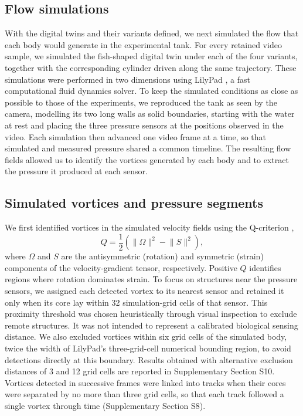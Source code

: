 \documentclass[openacc]{rsproca_new}
\begin{document}
\subsection{Flow simulations}

With the digital twins and their variants defined, we next simulated the flow that each body would generate in the experimental tank. For every retained video sample, we simulated the fish-shaped digital twin under each of the four variants, together with the corresponding cylinder driven along the same trajectory. These simulations were performed in two dimensions using LilyPad \cite{maertens2015}, a fast computational fluid dynamics solver. To keep the simulated conditions as close as possible to those of the experiments, we reproduced the tank as seen by the camera, modelling its two long walls as solid boundaries, starting with the water at rest and placing the three pressure sensors at the positions observed in the video. Each simulation then advanced one video frame at a time, so that simulated and measured pressure shared a common timeline. The resulting flow fields allowed us to identify the vortices generated by each body and to extract the pressure it produced at each sensor.

\subsection{Simulated vortices and pressure segments}
\label{sec:vortices}

We first identified vortices in the simulated velocity fields using the Q-criterion \cite{hunt1988,kolar2007},
\begin{equation}
Q=\frac{1}{2}\left(\lVert \Omega \rVert^2-\lVert S \rVert^2\right),
\end{equation}
where $\Omega$ and $S$ are the antisymmetric (rotation) and symmetric (strain) components of the velocity-gradient tensor, respectively. Positive $Q$ identifies regions where rotation dominates strain. To focus on structures near the pressure sensors, we assigned each detected vortex to its nearest sensor and retained it only when its core lay within 32 simulation-grid cells of that sensor. This proximity threshold was chosen heuristically through visual inspection to exclude remote structures. It was not intended to represent a calibrated biological sensing distance. We also excluded vortices within six grid cells of the simulated body, twice the width of LilyPad's three-grid-cell numerical bounding region, to avoid detections directly at this boundary. Results obtained with alternative exclusion distances of 3 and 12 grid cells are reported in Supplementary Section S10. Vortices detected in successive frames were linked into tracks when their cores were separated by no more than three grid cells, so that each track followed a single vortex through time (Supplementary Section S8).
\end{document}
